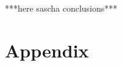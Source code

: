 \documentclass[UKenglish,texlive=2013]{\ATLASLATEXPATH atlasdoc}
\newcommand{\mta}{m^{TA}}
\newcommand{\mtas}{m^{TAS}}
\begin{document}


***here sascha conclusions***

\clearpage
\appendix
\part*{Appendix}





\end{document}
